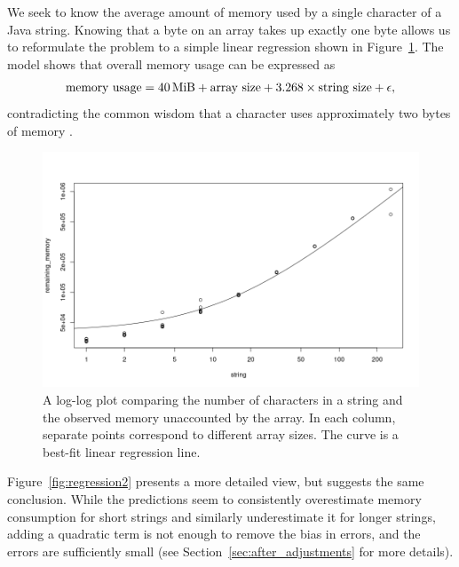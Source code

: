 \documentclass{article}
\begin{document}
We seek to know the average amount of memory used by a single character of a
Java string. Knowing that a byte on an array takes up exactly one byte allows us
to reformulate the problem to a simple linear regression shown in
Figure~\ref{fig:regression1}. The model shows that overall memory usage can be
expressed as
\begin{equation} \label{eq:regression}
  \text{memory usage} = \SI{40}{\mebi\byte} + \text{array size} + 3.268 \times
  \text{string size} + \epsilon,
\end{equation}
contradicting the common wisdom that a character uses approximately two bytes of
memory \cite{java_memory}.

\begin{figure}
  \centering
  \includegraphics[width=\textwidth]{../local_experiments/memory_tests/prediction2.png}
  \caption{A log-log plot comparing the number of characters in a string and the
  observed memory unaccounted by the array. In each column, separate points
  correspond to different array sizes. The curve is a best-fit linear regression
  line.}
  \label{fig:regression1}
\end{figure}

Figure~\ref{fig:regression2} presents a more detailed view, but suggests
the same conclusion. While the predictions seem to consistently overestimate
memory consumption for short strings and similarly underestimate it for longer
strings, adding a quadratic term is not enough to remove the bias in errors, and
the errors are sufficiently small (see Section~\ref{sec:after_adjustments} for
more details).
\end{document}
